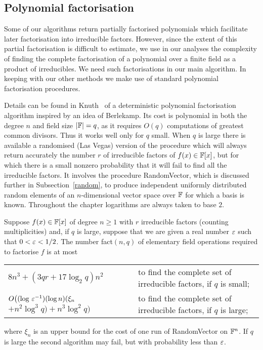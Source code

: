 \subsection{Polynomial factorisation}\label{polyfactn}

Some of our algorithms return partially factorised polynomials
which facilitate later factorisation into
irreducible factors. However, since the extent of this partial factorisation
is difficult to estimate, we use in our
analyses the complexity of finding the complete 
factorisation of a polynomial over a finite field as a product of 
irreducibles. We need such factorisations in our main algorithm.
In keeping with our other methods we make use of standard
polynomial factorisation procedures.

Details can be found in Knuth~\cite[4.6.2]{AOCP2} of a deterministic 
polynomial factorisation algorithm inspired by an idea of Berlekamp. 
Its cost is polynomial in both the degree $n$ and field size 
$|\mathbb{F}|=q$, as it requires $O(q)$ computations
of greatest common divisors. Thus it works well only for $q$ small. 
When $q$ is large there is available a randomised (Las Vegas) 
version of the procedure 
which will always return accurately the number $r$ of irreducible factors 
of $f(x)\in\mathbb{F}[x]$, but for which there is a small nonzero probability that it will 
fail to find all the irreducible factors.
It involves the procedure {\sc RandomVector}, which is discussed further in Subsection~\ref{random}, to 
produce independent uniformly distributed random elements of an 
$n$-dimensional vector space over $\mathbb{F}$  for 
which a basis is known. Throughout the chapter logarithms are always taken to base $2$.

\begin{Rem}[\sc PolynomialFactorisation]\label{rem:polyfactn}
Suppose $f(x)\in \mathbb{F}[x]$ of degree $n\geq 1$ with $r$ irreducible 
factors (counting multiplicities) and, if $q$ is large, suppose that 
we are given a real number $\varepsilon$ such that $0<\varepsilon<1/2$. The  number 
fact$(n,q)$ of elementary field operations required to factorise $f$ is at most

\smallskip
\begin{tabular}{lp{2.5in}}
$8n^3 + (3qr+17\log_2q)n^2$&to find the complete set of irreducible 
factors, if $q$ is small; \\
$O\big((\log \,\varepsilon^{-1})(\log n)(\xi_n $ $+ n^2\log^3 q) +n^3\log^2q\big)$& 
to find the complete set of irreducible factors, if $q$ is large;\\
\end{tabular}

\noindent where $\xi_n$ is an upper bound for the cost of one run of\/
{\sc RandomVector} on $\mathbb{F}^n$.
If $q$ is large the second algorithm may fail, but with probability less than $\varepsilon$.
\end{Rem}





